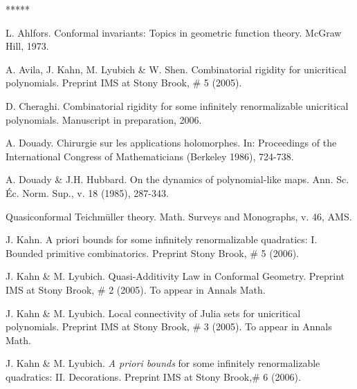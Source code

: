 
\begin{thebibliography}{*****}


 L. Ahlfors. Conformal invariants: Topics in geometric function theory. McGraw Hill, 1973.

 A. Avila, J. Kahn, M. Lyubich \& W. Shen. 
   Combinatorial rigidity for unicritical polynomials. 
   Preprint IMS at Stony Brook, \# 5 (2005).


 D. Cheraghi. Combinatorial rigidity for some infinitely renormalizable
  unicritical polynomials. Manuscript in preparation, 2006.  

 A. Douady. Chirurgie sur les applications holomorphes.
 In: Proceedings of the International Congress of Mathematicians
  (Berkeley 1986), 724-738.

 A. Douady \& J.H. Hubbard. On the dynamics of polynomial-like maps.
    Ann. Sc. \'{E}c. Norm. Sup., v. 18 (1985), 287-343.




 Quasiconformal Teichm\"uller theory.
   Math. Surveys and Monographs, v. 46, AMS.

 J. Kahn. A priori bounds for some infinitely renormalizable quadratics: I.
                  Bounded primitive combinatorics. Preprint Stony Brook, \# 5 (2006).   



 J. Kahn \& M. Lyubich.
   Quasi-Additivity Law in Conformal Geometry. Preprint IMS at Stony Brook, \# 2 (2005). 
   To appear in Annals Math. 

 J. Kahn \& M. Lyubich. 
  Local connectivity of Julia sets for unicritical polynomials. 
 Preprint IMS at Stony Brook, \# 3 (2005). To appear in Annals Math. 

 J. Kahn \& M. Lyubich. {\it A priori bounds} for some infinitely
renormalizable quadratics: II.  Decorations. Preprint IMS at Stony Brook,\# 6 (2006).  


\end{thebibliography}
